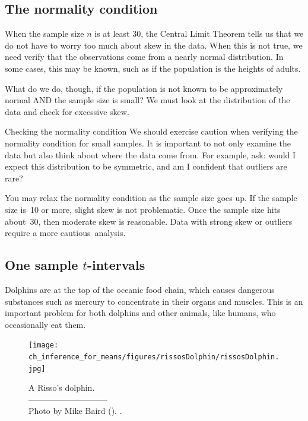 \subsection{The normality condition}
\label{normalityCond}

When the sample size $n$ is at least 30, the Central Limit Theorem tells us that we do not have to worry too much about skew in the data. When this is not true, we need verify that the observations come from a nearly normal distribution. In some cases, this may be known, such as if the population is the heights of adults.

What do we do, though, if the population is not known to be approximately normal AND the sample size is small?  We must look at the distribution of the data and check for excessive skew.

\begin{caution}{Checking the normality condition}
{We should exercise caution when verifying the normality condition for small samples. It is important to not only examine the data but also think about where the data come from. For example, ask: would I expect this distribution to be symmetric, and am I confident that outliers are rare?}
\end{caution}

You may relax the normality condition as the sample size goes up. If the sample size is~10 or more, slight skew is not problematic. Once the sample size hits about~30, then moderate skew is reasonable. Data with strong skew or outliers require a more \mbox{cautious analysis.}


\subsection{One sample $t$-intervals}
\label{oneSampleTConfidenceIntervals}

Dolphins are at the top of the oceanic food chain, which causes dangerous substances such as mercury to concentrate in their organs and muscles. This is an important problem for both dolphins and other animals, like humans, who occasionally eat them.
\setlength{\captionwidth}{86mm}

\begin{figure}[h]
\centering
\texttt{[image: ch\_inference\_for\_means/figures/rissosDolphin/rissosDolphin.jpg]}  \\
\addvspace{2mm}
\begin{minipage}{\textwidth}
   \caption[rissosDolphinPic]{A Risso's dolphin.\vspace{-1mm} \\
   -----------------------------\vspace{-2mm}\\
   {\footnotesize Photo by Mike Baird (). .\vspace{-10mm}}}
   \label{rissosDolphin}
\end{minipage}
\vspace{3mm}
\end{figure}
\setlength{\captionwidth}{\mycaptionwidth}

